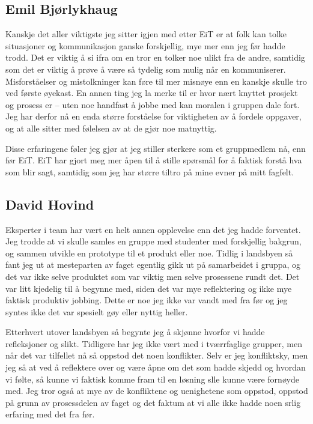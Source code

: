 \subsection*{Emil Bjørlykhaug}
Kanskje det aller viktigste jeg sitter igjen med etter EiT er at folk kan tolke situasjoner og kommunikasjon ganske forskjellig, mye mer enn jeg før hadde trodd. Det er viktig å si ifra om en tror en tolker noe ulikt fra de andre, samtidig som det er viktig å prøve å være så tydelig som mulig når en kommuniserer. Misforståelser og mistolkninger kan føre til mer misnøye enn en kanskje skulle tro ved første øyekast. En annen ting jeg la merke til er hvor nært knyttet prosjekt og prosess er – uten noe handfast å jobbe med kan moralen i gruppen dale fort. Jeg har derfor nå en enda større forståelse for viktigheten av å fordele oppgaver, og at alle sitter med følelsen av at de gjør noe matnyttig.

Disse erfaringene føler jeg gjør at jeg stiller sterkere som et gruppmedlem nå, enn før EiT. EiT har gjort meg mer åpen til å stille spørsmål for å faktisk forstå hva som blir sagt, samtidig som jeg har større tiltro på mine evner på mitt fagfelt. 

\subsection*{David Hovind}
Eksperter i team har vært en helt annen opplevelse enn det jeg hadde forventet. 
Jeg trodde at vi skulle samles en gruppe med studenter med forskjellig bakgrun, og sammen utvikle en prototype til et produkt eller noe. 
Tidlig i landsbyen så fant jeg ut at mesteparten av faget egentlig gikk ut på samarbeidet i gruppa, og det var ikke selve produktet som var viktig men selve prosessene rundt det. 
Det var litt kjedelig til å begynne med, siden det var mye reflektering og ikke mye faktisk produktiv jobbing. 
Dette er noe jeg ikke var vandt med fra før og jeg syntes ikke det var spesielt gøy eller nyttig heller.

Etterhvert utover landsbyen så begynte jeg å skjønne hvorfor vi hadde refleksjoner og slikt. 
Tidligere har jeg ikke vært med i tværrfaglige grupper, men når det var tilfellet nå så oppstod det noen konflikter. 
Selv er jeg konfliktsky, men jeg så at ved å reflektere over og være åpne om det som hadde skjedd og hvordan vi følte, så kunne vi faktisk komme fram til en løsning slle kunne være fornøyde med. 
Jeg tror også at mye av de konfliktene og uenighetene som oppstod, oppstod på grunn av prosessdelen av faget og det faktum at vi alle ikke hadde noen srlig erfaring med det fra før. 

